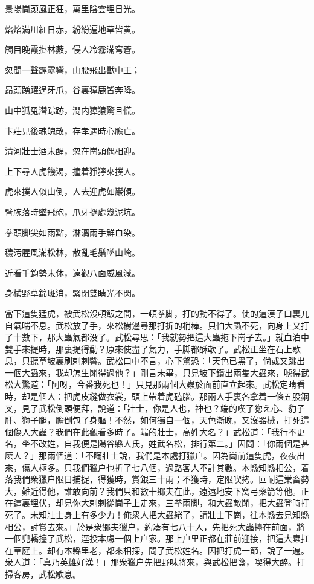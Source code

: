 \begin{myquote}
景陽崗頭風正狂，萬里陰雲埋日光。

焰焰滿川紅日赤，紛紛遍地草皆黄。

觸目晚霞掛林藪，侵人冷霧滿穹蒼。

忽聞一聲霹靂響，山腰飛出獸中王；

昂頭踴躍逞牙爪，谷裏獐鹿皆奔降。

山中狐兔潛踪跡，澗内獐猿驚且慌。

卞莊見後魂魄散，存孝遇時心膽亡。

清河壯士酒未醒，忽在崗頭偶相迎。

上下尋人虎饑渴，撞着猙獰來撲人。

虎來撲人似山倒，人去迎虎如巖傾。

臂腕落時墜飛砲，爪牙撾處幾泥坑。

拳頭脚尖如雨點，淋漓兩手鮮血染。

穢汚腥風滿松林，散亂毛鬚墜山崦。

近看千鈞勢未休，遠觀八面威風減。

身横野草錦斑消，緊閉雙睛光不閃。
\end{myquote}
	
當下這隻猛虎，被武松沒頓飯之間，一頓拳脚，打的動不得了。使的這漢子口裏兀自氣喘不息。武松放了手，來松樹邊尋那打折的梢棒。只怕大蟲不死，向身上又打了十數下，那大蟲氣都没了。武松尋思：「我就勢把這大蟲拖下崗子去。」就血泊中雙手來提時，那裏提得動？原來使盡了氣力，手脚都酥軟了。武松正坐在石上歇息，只聽草坡裏刷剌剌響。武松口中不言，心下驚恐：「天色已黑了，倘或又跳出一個大蟲來，我却怎生鬦得過他？」剛言未畢，只見坡下鑽出兩隻大蟲來，唬得武松大驚道：「阿呀，今番我死也！」只見那兩個大蟲於面前直立起來。武松定睛看時，却是個人：把虎皮縫做衣裳，頭上帶着虎磕腦。那兩人手裏各拿着一條五股鋼叉，見了武松倒頭便拜，說道：「壯士，你是人也，神也？端的喫了㺀え心、豹子肝、獅子腿，膽倒包了身軀！不然，如何獨自一個，天色漸晚，又沒器械，打死這個傷人大蟲？我們在此觀看多時了。端的壯士，高姓大名？」武松道：「我行不更名，坐不改姓，自我便是陽谷縣人氏，姓武名松，排行第二。」因問：「你兩個是甚麽人？」那兩個道：「不瞞壯士說，我們是本處打獵户。因為崗前這隻虎，夜夜出來，傷人極多。只我們獵户也折了七八個，過路客人不計其數。本縣知縣相公，着落我們衆獵户限日捕捉，得獲時，賞銀三十兩；不獲時，定限喫拷。叵耐這業畜勢大，難近得他，誰敢向前？我們只和數十鄉夫在此，遠遠地安下窝弓藥箭等他。正在這裏埋伏，却見你大剌剌從崗子上走來，三拳兩脚，和大蟲敵鬦，把大蟲登時打死了。未知壯士身上有多少力！俺衆人把大蟲綣了，請壯士下崗，往本縣去見知縣相公，討賞去來。」於是衆鄉夫獵户，約凑有七八十人，先把死大蟲擡在前面，將一個兜轎擡了武松，逕投本䖏一個上户家。那上户里正都在莊前迎接，把這大蟲扛在草庭上。却有本縣里老，都來相探，問了武松姓名。因把打虎一節，說了一遍。衆人道：「真乃英雄好漢！」那衆獵户先把野味將來，與武松把盞，喫得大醉。打掃客房，武松歇息。

